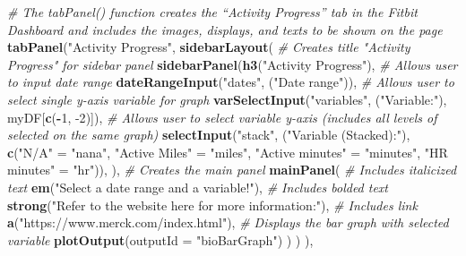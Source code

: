 \documentclass[]{book}
\newenvironment{Shaded}{\begin{snugshade}}{\end{snugshade}}
\newcommand{\CommentTok}[1]{\textcolor[rgb]{0.56,0.35,0.01}{\textit{#1}}}
\newcommand{\DataTypeTok}[1]{\textcolor[rgb]{0.13,0.29,0.53}{#1}}
\newcommand{\DecValTok}[1]{\textcolor[rgb]{0.00,0.00,0.81}{#1}}
\newcommand{\KeywordTok}[1]{\textcolor[rgb]{0.13,0.29,0.53}{\textbf{#1}}}
\newcommand{\NormalTok}[1]{#1}
\newcommand{\OperatorTok}[1]{\textcolor[rgb]{0.81,0.36,0.00}{\textbf{#1}}}
\newcommand{\StringTok}[1]{\textcolor[rgb]{0.31,0.60,0.02}{#1}}
\begin{document}
\begin{Shaded}
\begin{Highlighting}[]
{{             \CommentTok{# The tabPanel() function creates the “Activity Progress” tab in the Fitbit Dashboard and includes the images, displays, and texts to be shown on the page}
             \KeywordTok{tabPanel}\NormalTok{(}\StringTok{"Activity Progress"}\NormalTok{,}
                      \KeywordTok{sidebarLayout}\NormalTok{(}
                        \CommentTok{# Creates title "Activity Progress" for sidebar panel}
                        \KeywordTok{sidebarPanel}\NormalTok{(}\KeywordTok{h3}\NormalTok{(}\StringTok{"Activity Progress"}\NormalTok{),}
                                     \CommentTok{# Allows user to input date range}
                                     \KeywordTok{dateRangeInput}\NormalTok{(}\StringTok{"dates"}\NormalTok{, (}\StringTok{"Date range"}\NormalTok{)),}
                                     \CommentTok{# Allows user to select single y-axis variable for graph}
                                     \KeywordTok{varSelectInput}\NormalTok{(}\StringTok{"variables"}\NormalTok{, (}\StringTok{"Variable:"}\NormalTok{), myDF[}\KeywordTok{c}\NormalTok{(}\OperatorTok{-}\DecValTok{1}\NormalTok{, }\DecValTok{-2}\NormalTok{)]),}
                                     \CommentTok{# Allows user to select variable y-axis (includes all levels of selected on the same graph)}
                                     \KeywordTok{selectInput}\NormalTok{(}\StringTok{"stack"}\NormalTok{, (}\StringTok{"Variable (Stacked):"}\NormalTok{),}
                                                 \KeywordTok{c}\NormalTok{(}\StringTok{"N/A"}\NormalTok{ =}\StringTok{ "nana"}\NormalTok{, }\StringTok{"Active Miles"}\NormalTok{ =}\StringTok{ "miles"}\NormalTok{, }\StringTok{"Active minutes"}\NormalTok{ =}\StringTok{ "minutes"}\NormalTok{, }\StringTok{"HR minutes"}\NormalTok{ =}\StringTok{ "hr"}\NormalTok{)),}
\NormalTok{                        ),}
                        \CommentTok{# Creates the main panel}
                        \KeywordTok{mainPanel}\NormalTok{(}
                          \CommentTok{# Includes italicized text}
                          \KeywordTok{em}\NormalTok{(}\StringTok{"Select a date range and a variable!"}\NormalTok{),}
                          \CommentTok{# Includes bolded text}
                          \KeywordTok{strong}\NormalTok{(}\StringTok{"Refer to the website here for more information:"}\NormalTok{),}
                          \CommentTok{# Includes link}
                          \KeywordTok{a}\NormalTok{(}\StringTok{"https://www.merck.com/index.html"}\NormalTok{),}
                          \CommentTok{# Displays the bar graph with selected variable}
                          \KeywordTok{plotOutput}\NormalTok{(}\DataTypeTok{outputId =} \StringTok{"bioBarGraph"}\NormalTok{)}
\NormalTok{                        )}
\NormalTok{                      )}
\NormalTok{             ), }
             
}}
\end{Highlighting}
\end{Shaded}
\end{document}
